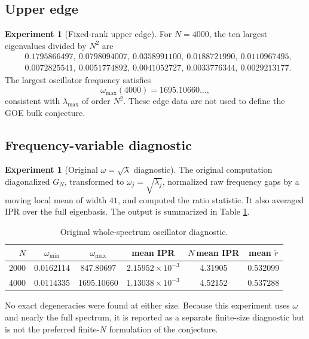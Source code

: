 \documentclass[11pt]{amsart}
\numberwithin{equation}{section}
\theoremstyle{plain}
\theoremstyle{definition}
\newtheorem{experiment}[theorem]{Experiment}
\theoremstyle{remark}
\begin{document}
\subsection{Upper edge}
\label{subsec:upper_edge}

\begin{experiment}[Fixed-rank upper edge]
\label{exp:upper_edge}
For $N=4000$, the ten largest eigenvalues divided by $N^2$ are
\begin{align}
&0.1795866497,\ 0.0798094007,\ 0.0358991100,\ 0.0188721990,\ 0.0110967495,
\label{eq:edge_top_five}\\
&0.0072825541,\ 0.0051774892,\ 0.0041052727,\ 0.0033776344,\ 0.0029213177.
\label{eq:edge_next_five}
\end{align}
The largest oscillator frequency satisfies
\begin{equation}
\omega_{\max}(4000)=1695.10660\ldots,
\label{eq:omega_max_4000}
\end{equation}
consistent with $\lambda_{\max}$ of order $N^2$.  These edge data are not used to define the GOE bulk conjecture.
\end{experiment}

\subsection{Frequency-variable diagnostic}
\label{subsec:original_oscillator}

\begin{experiment}[Original $\omega=\sqrt\lambda$ diagnostic]
\label{exp:original_oscillator}
The original computation diagonalized $G_N$, transformed to $\omega_j=\sqrt{\lambda_j}$, normalized raw frequency gaps by a moving local mean of width $41$, and computed the ratio statistic.  It also averaged IPR over the full eigenbasis.  The output is summarized in Table \ref{tab:original_oscillator}.

\begin{table}[htbp]
\centering
\caption{Original whole-spectrum oscillator diagnostic.}
\label{tab:original_oscillator}
\begin{tabular}{rccccc}
\toprule
$N$ & $\omega_{\min}$ & $\omega_{\max}$ & mean IPR & $N\,$mean IPR & mean $\widetilde r$\\
\midrule
2000 & 0.0162114 & 847.80697  & $2.15952\times10^{-3}$ & 4.31905 & 0.532099\\
4000 & 0.0114335 & 1695.10660 & $1.13038\times10^{-3}$ & 4.52152 & 0.537288\\
\bottomrule
\end{tabular}
\end{table}

No exact degeneracies were found at either size.  Because this experiment uses $\omega$ and nearly the full spectrum, it is reported as a separate finite-size diagnostic but is not the preferred finite-$N$ formulation of the conjecture.
\end{experiment}
\end{document}
